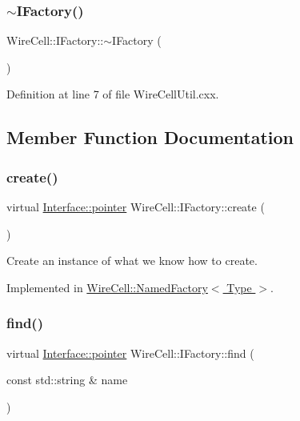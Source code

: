 \subsubsection{\texorpdfstring{$\sim$\+I\+Factory()}{~IFactory()}}
{\footnotesize\ttfamily Wire\+Cell\+::\+I\+Factory\+::$\sim$\+I\+Factory (\begin{DoxyParamCaption}{ }\end{DoxyParamCaption})\hspace{0.3cm}{\ttfamily [virtual]}}



Definition at line 7 of file Wire\+Cell\+Util.\+cxx.



\subsection{Member Function Documentation}
\mbox{\label{class_wire_cell_1_1_i_factory_a179e399381c19d1b49bcce704cee5c96}} 
\subsubsection{\texorpdfstring{create()}{create()}}
{\footnotesize\ttfamily virtual \hyperlink{class_wire_cell_1_1_interface_a09c548fb8266cfa39afb2e74a4615c37}{Interface\+::pointer} Wire\+Cell\+::\+I\+Factory\+::create (\begin{DoxyParamCaption}{ }\end{DoxyParamCaption})\hspace{0.3cm}{\ttfamily [pure virtual]}}



Create an instance of what we know how to create. 



Implemented in \hyperlink{class_wire_cell_1_1_named_factory_a1f5abc7490577953e98a1bfd65671236}{Wire\+Cell\+::\+Named\+Factory$<$ Type $>$}.

\mbox{\label{class_wire_cell_1_1_i_factory_a4365897d9d1e7951ce53c553dba3e116}} 
\subsubsection{\texorpdfstring{find()}{find()}}
{\footnotesize\ttfamily virtual \hyperlink{class_wire_cell_1_1_interface_a09c548fb8266cfa39afb2e74a4615c37}{Interface\+::pointer} Wire\+Cell\+::\+I\+Factory\+::find (\begin{DoxyParamCaption}\item[{const std\+::string \&}]{name }\end{DoxyParamCaption})\hspace{0.3cm}{\ttfamily [pure virtual]}}



